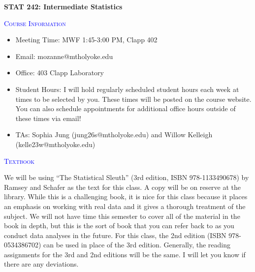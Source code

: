 \documentclass[12pt,a4paper]{article}
\begin{document}
\newcommand{\diag}{\mathrm{diag}}
\newcommand{\E}{\mathrm{E}}
\newcommand{\Cov}{\mathrm{Cov}}
\newcommand{\Corr}{\mathrm{Corr}}
\newcommand{\Var}{\mathrm{Var}}
\newcommand{\SD}{\mathrm{SD}}
\newcommand{\SE}{\mathrm{SE}}
\newcommand{\MSE}{\mathrm{MSE}}
\newcommand{\Bernoulli}{\mathrm{Bernoulli}}
\newcommand{\Beta}{\mathrm{Beta}}
\newcommand{\Bias}{\mathrm{Bias}}
\newcommand{\Binomial}{\mathrm{Binomial}}
\newcommand{\Multinomial}{\mathrm{Multinomial}}
\newcommand{\Normal}{\mathrm{Normal}}
\newcommand{\Poisson}{\mathrm{Poisson}}
\newcommand{\logit}{\mathrm{logit}}
\newcommand{\tr}{\mathrm{tr}}
\newcommand{\IG}{\mathrm{IG}}
\newcommand\independent{\protect\mathpalette{\protect\independenT}{\perp}}
\def\independenT#1#2{\mathrel{\rlap{$#1#2$}\mkern2mu{#1#2}}}

\begin{center}
\textbf{STAT 242: Intermediate Statistics}
\end{center}


\textcolor{blue}{\textsc{Course Information}}

\begin{itemize}
\item Meeting Time: MWF 1:45-3:00 PM, Clapp 402
\item Email: mozanne@mtholyoke.edu
\item Office: 403 Clapp Laboratory
\item Student Hours: I will hold regularly scheduled student hours each week at times to be selected by you. These times will be posted on the course website. You can also schedule appointments for additional office hours outside of these times via email!
\item TAs: Sophia Jung (jung26s@mtholyoke.edu) and Willow Kelleigh (kelle23w@mtholyoke.edu) 
\end{itemize}

\vspace{2mm}

\textcolor{blue}{\textsc{Textbook}}

We will be using “The Statistical Sleuth” (3rd edition, ISBN 978-1133490678) by Ramsey and Schafer as the text for this class. A copy will be on reserve at the library. While this is a challenging book, it is nice for this class because it places an emphasis on working with real data and it gives a thorough treatment of the subject. We will not have time this semester to cover all of the material in the book in depth, but this is the sort of book that you can refer back to as you conduct data analyses in the future. For this class, the 2nd edition (ISBN 978-0534386702) can be used in place of the 3rd edition. Generally, the reading assignments for the 3rd and 2nd editions will be the same. I will let you know if there are any deviations. 
\end{document}
